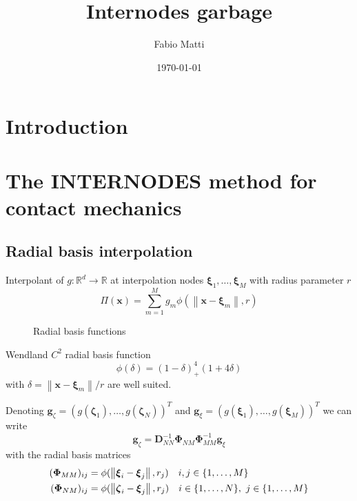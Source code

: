 \documentclass[11pt, a4paper]{article}
\title{Internodes garbage}
\author{Fabio Matti}
\date{\today}
\begin{document}
\maketitle

\section{Introduction}
\label{sec:intro}

\clearpage

\section{The INTERNODES method for contact mechanics}
\label{sec:internodes}

\subsection{Radial basis interpolation}
\label{subsec:rbf-interpolation}

Interpolant of $g : \mathbb{R}^d \to \mathbb{R}$ at interpolation nodes $\boldsymbol{\xi}_1, \dots, \boldsymbol{\xi}_M$  with radius parameter $r$
\begin{equation}
    \Pi(\mathbf{x}) = \sum_{m=1}^M g_m \phi(\left\| \mathbf{x} - \boldsymbol{\xi}_m \right\|, r)
\end{equation}

\begin{figure}[ht]
    \centering
    
    \caption{Radial basis functions}\label{fig:radialbasis}
\end{figure}

Wendland $C^2$ radial basis function
\begin{equation}
    \phi(\delta) = (1 - \delta)_{+}^4(1 + 4\delta) 
\end{equation}
with $\delta = \left\| \mathbf{x} - \boldsymbol{\xi}_m \right\| / r$ are well suited.

Denoting $\mathbf{g}_{\zeta} = (g(\boldsymbol{\zeta}_1), \dots, g(\boldsymbol{\zeta}_N))^T$ and $\mathbf{g}_{\xi} = (g(\boldsymbol{\xi}_1), \dots, g(\boldsymbol{\xi}_M))^T$ we can write
\begin{equation}
    \mathbf{g}_{\zeta} = \mathbf{D}_{NN}^{-1} \boldsymbol{\Phi}_{NM} \boldsymbol{\Phi}_{MM}^{-1} \mathbf{g}_{\xi}
\end{equation}
with the radial basis matrices
\begin{align}
    (\boldsymbol{\Phi}_{MM})_{ij} &= \phi(\left\| \boldsymbol{\xi}_i - \boldsymbol{\xi}_j \right\|, r_j) \hspace{10px} i, j \in \{1, \dots, M\} \\
    (\boldsymbol{\Phi}_{NM})_{ij} &= \phi(\left\| \boldsymbol{\zeta}_i - \boldsymbol{\xi}_j \right\|, r_j) \hspace{10px} i \in \{1, \dots, N\},~ j \in \{1, \dots, M\}
\end{align}
\end{document}
